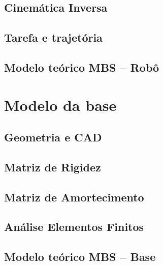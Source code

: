 \medskip {}




\subsection{Cinemática Inversa}\label{sec::ikin_mh12}

\subsection{Tarefa e trajetória}

\subsection{Modelo teórico MBS -- Robô}


\section{Modelo da base}

\subsection{Geometria e CAD}

\subsection{Matriz de Rigidez}

\subsection{Matriz de Amortecimento}

\subsection{Análise Elementos Finitos}

\subsection{Modelo teórico MBS -- Base}


